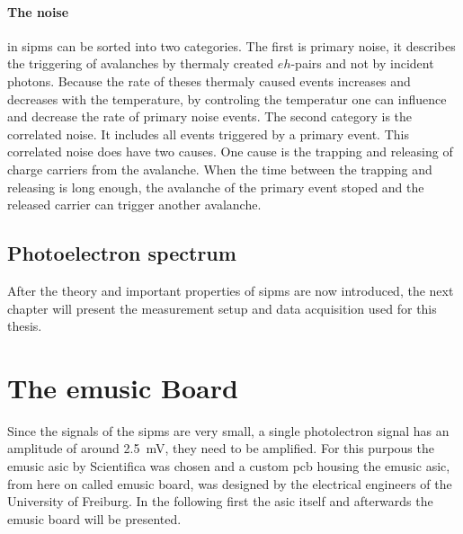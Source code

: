 \paragraph{The noise} in \acp{sipm} can be sorted into two categories.
The first is primary noise, it describes the triggering of avalanches by thermaly created $eh$-pairs and not by incident photons.
Because the rate of theses thermaly caused events increases and decreases with the temperature, by controling the temperatur one can influence and decrease the rate of primary noise events.
The second category is the correlated noise.
It includes all events triggered by a primary event.
This correlated noise does have two causes.
One cause is the trapping and releasing of charge carriers from the avalanche. 
When the time between the trapping and releasing is long enough, the avalanche of the primary event stoped and the released carrier can trigger another avalanche.



\subsection{Photoelectron spectrum}


After the theory and important properties of \acp{sipm} are now introduced, the next chapter will present the measurement setup and data acquisition used for this thesis.

\section{The \ac{emusic} Board}
Since the signals of the \acp{sipm} are very small, a single photolectron signal has an amplitude of around \SI{2.5}{\milli\volt}, they need to be amplified.
For this purpous the \ac{emusic} \ac{asic} by Scientifica was chosen and a custom \ac{pcb} housing the \ac{emusic} \ac{asic}, from here on called \ac{emusic} board, was designed by the electrical engineers of the University of Freiburg.
In the following first the \ac{asic} itself and afterwards the \ac{emusic} board will be presented.

